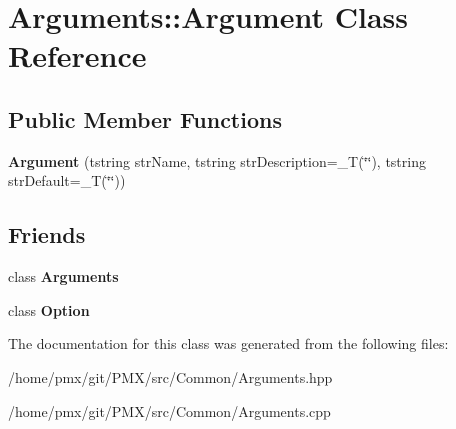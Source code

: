 \hypertarget{classArguments_1_1Argument}{}\section{Arguments\+:\+:Argument Class Reference}
\label{classArguments_1_1Argument}
\subsection*{Public Member Functions}
\begin{DoxyCompactItemize}
\item 
\mbox{\label{classArguments_1_1Argument_a63994b9ef997efd8a851f793d7ffa63e}} 
{\bfseries Argument} (tstring str\+Name, tstring str\+Description=\+\_\+T(\char`\"{}\char`\"{}), tstring str\+Default=\+\_\+T(\char`\"{}\char`\"{}))
\end{DoxyCompactItemize}
\subsection*{Friends}
\begin{DoxyCompactItemize}
\item 
\mbox{\label{classArguments_1_1Argument_acbd2a21b98cd2cb694fd02340724b625}} 
class {\bfseries Arguments}
\item 
\mbox{\label{classArguments_1_1Argument_abd6e6c0003d4ecf9ff0385ab131dcc0e}} 
class {\bfseries Option}
\end{DoxyCompactItemize}


The documentation for this class was generated from the following files\+:\begin{DoxyCompactItemize}
\item 
/home/pmx/git/\+P\+M\+X/src/\+Common/Arguments.\+hpp\item 
/home/pmx/git/\+P\+M\+X/src/\+Common/Arguments.\+cpp\end{DoxyCompactItemize}
